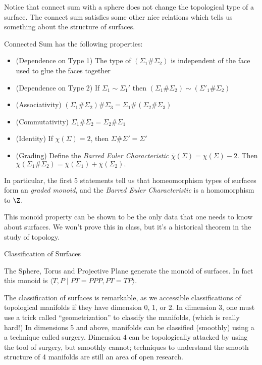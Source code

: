 Notice that connect sum with a sphere does not change the topological type of a surface. The connect sum satisfies some other nice relations which tells us something about the structure of surfaces. 
\begin{claim}
 Connected Sum has the following properties:
 \begin{itemize}
  \item (Dependence on Type 1) The type of $(\Sigma_1\#\Sigma_2)$ is independent of the face used to glue the faces together
  \item (Dependence on Type 2) If $\Sigma_1\sim \Sigma_1'$ then $(\Sigma_1\#\Sigma_2)\sim (\Sigma'_1\#\Sigma_2)$
  \item (Associativity) $(\Sigma_1\#\Sigma_2)\#\Sigma_3=\Sigma_1\#(\Sigma_2\#\Sigma_3)$
  \item (Commutativity) $\Sigma_1\# \Sigma_2=\Sigma_2\#\Sigma_1$
  \item (Identity) If $\chi(\Sigma)=2$, then $\Sigma\#\Sigma'=\Sigma'$
  \item (Grading) Define the \emph{Barred Euler Characteristic} $\bar\chi(\Sigma)=\chi(\Sigma)-2$. Then $ \bar\chi(\Sigma_1\# \Sigma_2)= \bar\chi(\Sigma_1)+\bar\chi(\Sigma_2). $ \footnotemark
 \end{itemize}
 In particular, the first 5 statements tell us that homeomorphism types of surfaces form an \emph{graded monoid}, and the \emph{Barred Euler Characteristic} is a homomorphism to $\Z$.    
\end{claim}
This monoid property can be shown to be \label{proj:classification} the only data that one needs to know about surfaces. We won't prove this in class, but it's a historical theorem in the study of topology. 

\begin{projectdescription}{Classification of Surfaces}


\begin{theorem}
 The Sphere, Torus and Projective Plane generate the monoid of surfaces. In fact this monoid is $\langle T, P \;|\; PT=PPP, PT=TP\rangle. $
\end{theorem}
The classification of surfaces is remarkable, as we accessible  classifications of topological manifolds if they have dimension 0, 1, or 2.  In dimension 3, one must use a trick called ``geometrization'' to classify the manifolds, (which is really hard!) In dimensions 5 and above, manifolds can be classified (smoothly) using a a technique called surgery. Dimension 4 can be topologically attacked by using the tool of surgery, but smoothly cannot; techniques to understand the smooth structure of 4 manifolds are still an area of open research.
\end{projectdescription} 



